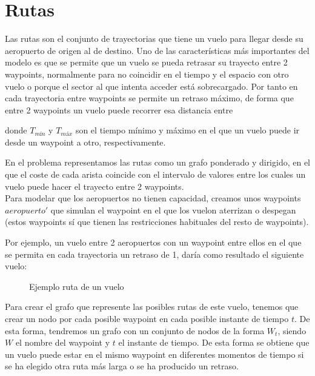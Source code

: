 \section{Rutas}
Las rutas son el conjunto de trayectorias que tiene un vuelo para llegar desde su aeropuerto de origen al de destino. Uno de las características más importantes del modelo es que se permite que un vuelo se pueda retrasar su trayecto entre 2 waypoints, normalmente para no coincidir en el tiempo y el espacio con otro vuelo o porque el sector al que intenta acceder está sobrecargado. Por tanto en cada trayectoria entre waypoints se permite un retraso máximo, de forma que entre 2 waypoints un vuelo puede recorrer esa distancia entre
\begin{equation}
[T_{mín} , T_{máx}]
\end{equation}

donde 	$T_{mín}$ y $T_{máx}$ son el tiempo mínimo y máximo en el que un vuelo puede ir desde un waypoint a otro, respectivamente.

 En el problema representamos las rutas como un grafo ponderado y dirigido, en el que el coste de cada arista coincide con el intervalo de valores entre los cuales un vuelo puede hacer el trayecto entre 2 waypoints.\\
Para modelar que los aeropuertos no tienen capacidad, creamos unos waypoints $aeropuerto'$ que simulan el waypoint en el que los vuelon aterrizan o despegan (estos waypoints sí que tienen las restricciones habituales del resto de waypoints).

Por ejemplo, un vuelo entre 2 aeropuertos con un waypoint entre ellos en el que se permita en cada trayectoria un retraso de 1, daría como resultado el siguiente vuelo:
\begin{figure}[H]
	\centering
	
	\caption{Ejemplo ruta de un vuelo}
	\label{fig: Ejemplo ruta de un vuelo}
\end{figure}

Para crear el grafo que represente las posibles rutas de este vuelo, tenemos que crear un nodo por cada posible waypoint en cada posible instante de tiempo $t$. De esta forma, tendremos un grafo con un conjunto de nodos de la forma $W_{t}$, siendo $W$ el nombre del waypoint y $t$ el instante de tiempo. De esta forma se obtiene que un vuelo puede estar en el mismo waypoint en diferentes momentos de tiempo si se ha elegido otra ruta más larga o se ha producido un retraso.\\

